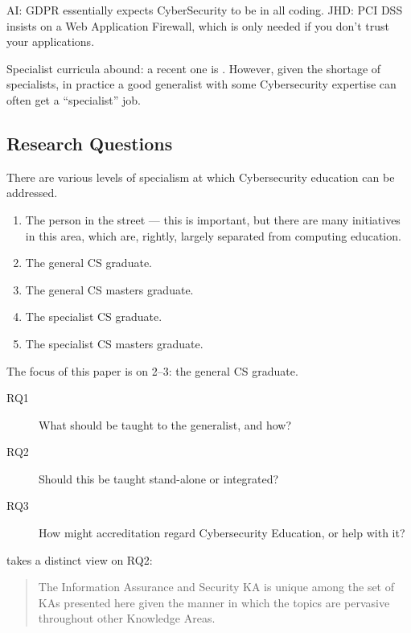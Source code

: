 \documentclass[sigconf,anonymous]{acmart}
\begin{document}
AI: GDPR essentially expects CyberSecurity to be in all coding. 
JHD: PCI DSS insists on a Web Application Firewall, which is only needed if you don't trust your applications.


Specialist curricula abound: a recent one is \cite{ACMIEEEAISSIGSECIFIP}. However, given the shortage of specialists, in practice a good generalist with some Cybersecurity expertise can often get a ``specialist'' job.
\subsection{Research Questions}
There are various levels of specialism at which Cybersecurity education can be addressed.
\begin{enumerate}
\item The person in the street --- this is important, but there are many initiatives in this area, which are, rightly, largely separated from computing education.
\item The general CS graduate.
\item The general CS masters graduate.
\item The specialist CS graduate.
\item The specialist CS masters graduate.
\end{enumerate}
The focus of this paper is on 2--3: the general CS graduate.
\begin{description}
\item[RQ1]What should be taught to the generalist, and how?
\item[RQ2]Should this be taught stand-alone or integrated? 
\item[RQ3]How might accreditation regard Cybersecurity Education, or help with it?
\end{description}
\cite[p.~97]{ACM2013a} takes a distinct view on RQ2:
\begin{quote}
The Information Assurance and Security KA is unique among the set of KAs presented here
given the manner in which the topics are pervasive throughout other Knowledge Areas.
\end{quote}
\end{document}
